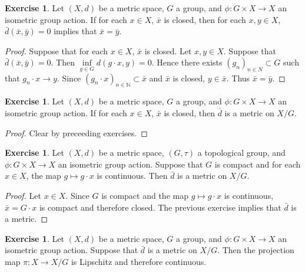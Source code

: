 \documentclass[12pt]{amsart}
\theoremstyle{definition}
\newtheorem{ex}[definition]{Exercise}
\newcommand{\N}{\mathbb{N}}
\DeclareMathOperator*{\0}{\mbf{0}}
\DeclareMathOperator*{\1}{\mbf{1}}
\newcommand{\lex}[1]{\label{ex:#1}}
\begin{document}
	\begin{ex} \lex{}
	Let $(X, d)$ be a metric space, $G$ a group, and $\phi: G \times X \rightarrow X$ an isometric group action. If for each $x \in X$, $\bar{x}$ is closed, then for each $x, y \in X$, $\bar{d}(\bar{x}, \bar{y}) =0$ implies that $\bar{x} = \bar{y}$.
	\end{ex}
	
	\begin{proof}
	Suppose that for each $x \in X$, $\bar{x}$ is closed. Let $x,y \in X$. Suppose that $\bar{d}(\bar{x} , \bar{y}) = 0$. Then $\inf\limits_{ g \in G} d(g \cdot x, y) = 0$. Hence there exists $(g_n)_{n \in N} \subset G$ such that $g_n \cdot x \rightarrow y$. Since $(g_n \cdot x)_{n \in \N} \subset \bar{x}$ and $\bar{x}$ is closed, $y \in \bar{x}$. Thus $\bar{x} = \bar{y}$. 
	\end{proof}
	
	\begin{ex} \lex{}
	Let $(X, d)$ be a metric space, $G$ a group, and $\phi: G \times X \rightarrow X$ an isometric group action. If for each $x \in X$, $\bar{x}$ is closed, then $\bar{d}$ is a metric on $X/G$.
	\end{ex}
	
	\begin{proof}
	Clear by preceeding exercises.
	\end{proof}
	
	\begin{ex} \lex{}
	Let $(X, d)$ be a metric space, $(G, \tau)$ a topological group, and $\phi: G \times X \rightarrow X$ an isometric group action. Suppose that $G$ is compact and for each $x \in X$, the map $g \mapsto g \cdot x$ is continuous. Then $\bar{d}$ is a metric on $X/G$. 
	\end{ex}
	
	\begin{proof}
	Let $x \in X$. Since $G$ is compact and the map $g \mapsto g \cdot x$ is continuous, $\bar{x} = G \cdot x$ is compact and therefore closed. The previous exercise implies that $\bar{d}$ is a metric.
	\end{proof}
	
	\begin{ex} \lex{}
	Let $(X, d)$ be a metric space, $G$ a group, and $\phi: G \times X \rightarrow X$ an isometric group action. Suppose that $\bar{d}$ is a metric on $X/G$. Then the projection map $\pi: X \rightarrow X/G$ is Lipschitz and therefore continuous.
	\end{ex}
	
\end{document}
